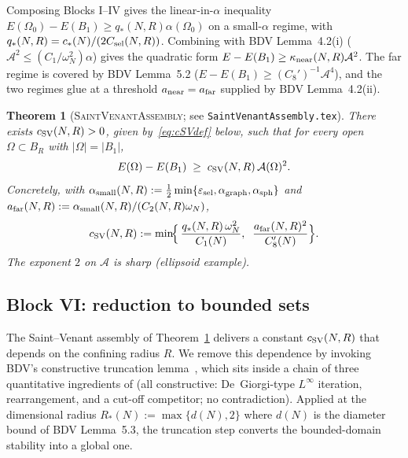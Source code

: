 \documentclass[11pt]{article}
\newtheorem{theorem}{Theorem}[section]
\theoremstyle{definition}
\newcommand{\Fr}{\mathcal{A}}
\newcommand{\Om}{\Omega}
\newcommand{\eps}{\varepsilon}
\begin{document}
Composing Blocks I--IV gives the linear-in-$\alpha$ inequality
$E(\Om_0)-E(B_1)\ge q_*(N,R)\alpha(\Om_0)$ on a small-$\alpha$ regime,
with $q_*(N,R)=c_*(N)/(2C_{\rm sel}(N,R))$. Combining with BDV
Lemma~4.2(i) ($\Fr^2\le(C_1/\omega_N^2)\alpha$) gives the quadratic
form $E-E(B_1)\ge\kappa_{\rm near}(N,R)\Fr^2$. The far regime is
covered by BDV Lemma~5.2 ($E-E(B_1)\ge(C_8')^{-1}\Fr^4$), and the two
regimes glue at a threshold $a_{\rm near}=a_{\rm far}$ supplied by BDV
Lemma~4.2(ii).

\begin{theorem}[\textsc{SaintVenantAssembly}; see
\texttt{SaintVenantAssembly.tex}]\label{thm:SV}
There exists $c_{\rm SV}(N,R)>0$, given by~\eqref{eq:cSVdef} below,
such that for every open $\Om\subset B_R$ with $|\Om|=|B_1|$,
\begin{equation}\label{eq:SV}
   E(\Om)-E(B_1)\;\ge\;c_{\rm SV}(N,R)\,\Fr(\Om)^2.
\end{equation}
Concretely, with $\alpha_{\rm small}(N,R)
:=\tfrac12\min\{\eps_{\rm sel},\alpha_{\rm graph},\alpha_{\rm sph}\}$ and
$a_{\rm far}(N,R):=\alpha_{\rm small}(N,R)/(C_2(N,R)\omega_N)$,
\begin{equation}\label{eq:cSVdef}
   c_{\rm SV}(N,R)
   :=\min\!\Bigl\{\,
        \frac{q_*(N,R)\,\omega_N^2}{C_1(N)},\;\;
        \frac{a_{\rm far}(N,R)^2}{C_8'(N)}
   \Bigr\}.
\end{equation}
The exponent $2$ on $\Fr$ is sharp (ellipsoid example).
\end{theorem}

\subsection{Block VI: reduction to bounded sets}

The Saint--Venant assembly of Theorem~\ref{thm:SV} delivers a
constant $c_{\rm SV}(N,R)$ that depends on the confining radius
$R$. We remove this dependence by invoking BDV's constructive
truncation lemma~\cite[Lemma~5.3]{BDV}, which sits inside a chain of
three quantitative ingredients of \cite[\S5]{BDV} (all
constructive: De~Giorgi-type $L^{\infty}$ iteration, rearrangement,
and a cut-off competitor; no contradiction). Applied at the
dimensional radius $R_{*}(N):=\max\{d(N),2\}$ where $d(N)$ is the
diameter bound of BDV Lemma~5.3, the truncation step converts the
bounded-domain stability into a global one.
\end{document}
